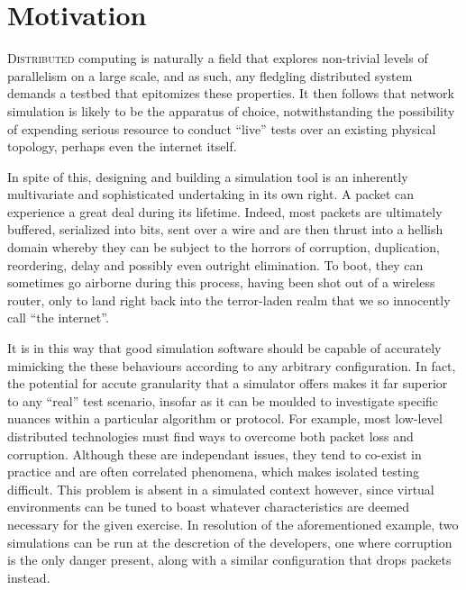 \section{Motivation}

\lettrine{D}{istributed} computing is naturally a field that explores non-trivial levels of parallelism on a large
scale, and as such, any fledgling distributed system demands a testbed that epitomizes these properties. It then
follows that network simulation is likely to be the apparatus of choice, notwithstanding the possibility of expending
serious resource to conduct ``live'' tests over an existing physical topology, perhaps even the internet itself.

In spite of this, designing and building a simulation tool is an inherently multivariate and sophisticated undertaking
in its own right. A packet can experience a great deal during its lifetime. Indeed, most packets are ultimately
buffered, serialized into bits, sent over a wire and are then thrust into a hellish domain whereby they can be
subject to the horrors of corruption, duplication, reordering, delay and possibly even outright elimination. To boot,
they can sometimes go airborne during this process, having been shot out of a wireless router, only to land right
back into the terror-laden realm that we so innocently call ``the internet''.

It is in this way that good simulation software should be capable of accurately mimicking the these behaviours
according to any arbitrary configuration. In fact, the potential for accute granularity that a simulator offers makes
it far superior to any ``real'' test scenario, insofar as it can be moulded to investigate specific nuances within a
particular algorithm or protocol. For example, most low-level distributed technologies must find ways to overcome
both packet loss and corruption. Although these are independant issues, they tend to co-exist in practice and are
often correlated phenomena, which makes isolated testing difficult. This problem is absent in a simulated context
however, since virtual environments can be tuned to boast whatever characteristics are deemed necessary for
the given exercise. In resolution of the aforementioned example, two simulations can be run at the descretion of the
developers, one where corruption is the only danger present, along with a similar configuration that drops packets
instead.

